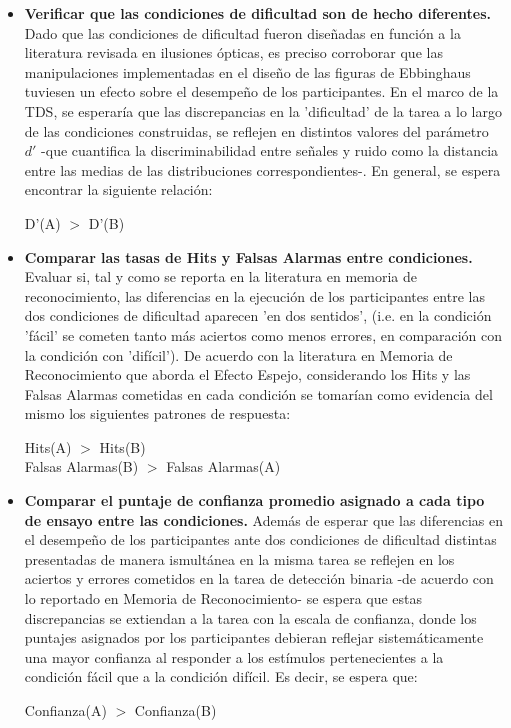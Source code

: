 \begin{itemize}
\item \textbf{Verificar que las condiciones de dificultad son de hecho diferentes.}
Dado que las condiciones de dificultad fueron diseñadas en función a la literatura revisada en ilusiones ópticas, es preciso corroborar que las manipulaciones implementadas en el diseño de las figuras de Ebbinghaus tuviesen un efecto sobre el desempeño de los participantes. En el marco de la TDS, se esperaría que las discrepancias en la 'dificultad' de la tarea a lo largo de las condiciones construidas, se reflejen en distintos valores del parámetro $d'$ -que cuantifica la discriminabilidad entre señales y ruido como la distancia entre las medias de las distribuciones correspondientes-. En general, se espera encontrar la siguiente relación:
\begin{center}
 D'(A) $>$ D'(B)\\
 \end{center}

 \item \textbf{Comparar las tasas de Hits y Falsas Alarmas entre condiciones.}
Evaluar si, tal y como se reporta en la literatura en memoria de reconocimiento, las diferencias en la ejecución de los participantes entre las dos condiciones de dificultad aparecen 'en dos sentidos', (i.e. en la condición 'fácil' se cometen tanto más aciertos como menos errores, en comparación con la condición con 'difícil'). De acuerdo con la literatura en Memoria de Reconocimiento que aborda el Efecto Espejo, considerando los Hits y las Falsas Alarmas cometidas en cada condición se tomarían como evidencia del mismo los siguientes patrones de respuesta:
\begin{center}
Hits(A) $>$ Hits(B)\\
Falsas Alarmas(B) $>$ Falsas Alarmas(A)\\
\end{center}

\item \textbf{Comparar el puntaje de confianza promedio asignado a cada tipo de ensayo entre las condiciones.}
Además de esperar que las diferencias en el desempeño de los participantes ante dos condiciones de dificultad distintas presentadas de manera ismultánea en la misma tarea se reflejen en los aciertos y errores cometidos en la tarea de detección binaria -de acuerdo con lo reportado en Memoria de Reconocimiento- se espera que estas discrepancias se extiendan a la tarea con la escala de confianza, donde los puntajes asignados por los participantes debieran reflejar sistemáticamente una mayor confianza al responder a los estímulos pertenecientes a la condición fácil que a la condición difícil. Es decir, se espera que:
\begin{center}
Confianza(A) $>$ Confianza(B)\\
\end{center}


\end{itemize}
